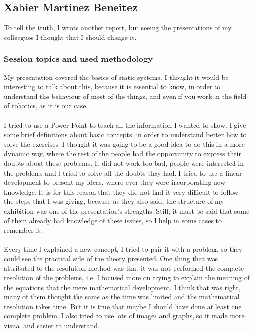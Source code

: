 \subsection{Xabier Martinez Beneitez}
To tell the truth, I wrote another report, but seeing the presentations of my colleagues I thought that I should change it.
\subsubsection{Session topics and used methodology}
My presentation covered the basics of static systems. I thought it would be interesting to talk about this, because it is essential to know, in order to understand the behaviour of most of the things, and even if you work in the field of robotics, as it is our case.\\\\
I tried to use a Power Point to teach all the information I wanted to show. I give some brief definitions about basic concepts, in order to understand better how to solve the exercises. I thought it was going to be a good idea to do this in a more dynamic way, where the rest of the people had the opportunity to express their doubts about these problems. It did not work too bad, people were interested in the problems and I tried to solve all the doubts they had. I tried to use a linear development to present my ideas, where ever they were incorporating new knowledge. It is for this reason that they did not find it very difficult to follow the steps that I was giving, because as they also said, the structure of my exhibition was one of the presentation's strengths. Still, it must be said that some of them already had knowledge of these issues, so I help in some cases to remember it.\\\\
Every time I explained a new concept, I tried to pair it with a problem, so they could see the practical side of the theory presented. One thing that was attributed to the resolution method was that it was not performed the complete resolution of the problems, i.e. I focused more on trying to explain the meaning of the equations that the mere mathematical development. I think that was right, many of them thought the same as the time was limited and the mathematical resolution takes time. But it is true that maybe I should have done at least one complete problem. I also tried to use lots of images and graphs, so it made more visual and easier to understand.\\\\
